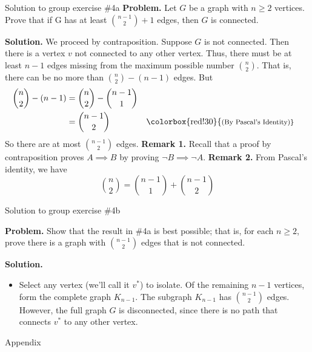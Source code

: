 \documentclass[10pt]{beamer}
\begin{document}
\begin{frame}{Solution to group exercise \#4a}
\small 
\textbf{Problem.} Let $G$ be a graph with $n \geq 2$ vertices.   Prove that if G has at least $\binom{n-1}{2} +1$ edges, then $G$ is connected.
\vfill 

\textbf{Solution.}
 We proceed \colorbox{green!30}{by contraposition}.  Suppose $G$ is not connected. Then there is a vertex $v$ not connected to any other vertex.  Thus, there must be at least $n-1$ edges missing from the maximum possible number $\binom{n}{2}$.  That is, there can be no more than $\binom{n}{2} - (n-1)$ edges.  But
    \begin{align*}
    \binom{n}{2} - (n-1) &= 	 \binom{n}{2} -   \binom{n-1}{1} \\
    &= \binom{n-1}{2} && \text{\colorbox{red!30}{\footnotesize{(By Pascal's Identity)}}}
    \end{align*}
    So there are at most $\binom{n-1}{2}$ edges.
\vfill 
\colorbox{green!30}{\textbf{Remark 1.}} Recall that a \colorbox{green!30}{proof by contraposition} proves $A \implies B$ by proving $\lnot B \implies \lnot A$.
\vfill 
\colorbox{red!30}{\textbf{Remark 2.}} From \colorbox{red!30}{Pascal's identity}, we have
\[\binom{n}{2} = \binom{n-1}{1}  + \binom{n-1}{2}  \]
\end{frame}

\begin{frame}{Solution to group exercise \#4b}

\textbf{Problem.} Show that the result in \#4a is best possible; that is, for each $n \geq 2$, prove there is a graph with 	$\binom{n-1}{2}$ edges that is not connected.
\vfill 

\textbf{Solution.}
    \begin{itemize}
        \item[b.] Select any vertex (we'll call it $v^*$) to isolate.  Of the remaining $n-1$ vertices, form the complete graph $K_{n-1}$.  The subgraph $K_{n-1}$ has $\binom{n-1}{2}$ edges.  However, the full graph $G$ is disconnected, since there is no path that connects $v^*$ to any other vertex.  
    \end{itemize}
\end{frame}

\begin{frame}[standout]
Appendix	
\end{frame}
\end{document}

